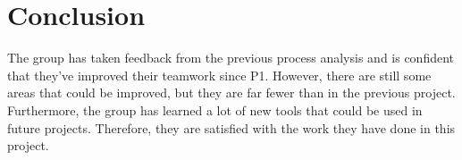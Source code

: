 \section{Conclusion}\label{sec:conclusion}

The group has taken feedback from the previous process analysis and is confident that they've improved their teamwork
since P1.
However, there are still some areas that could be improved, but they are far fewer than in the previous project.
Furthermore, the group has learned a lot of new tools that could be used in future projects.
Therefore, they are satisfied with the work they have done in this project.
